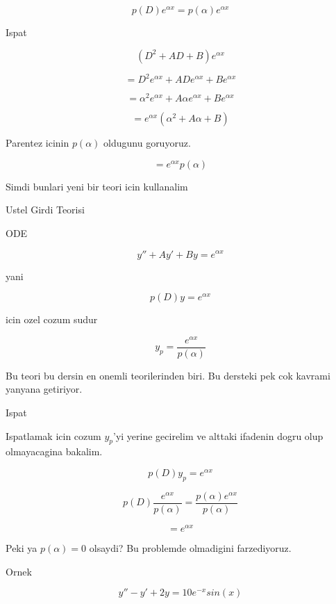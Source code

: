 \documentclass[12pt,fleqn]{article}
\begin{document}
\[ p(D)e^{\alpha x} = p(\alpha)e^{\alpha x}  \]

Ispat

\[ (D^2 + AD + B )e^{\alpha x} \]

\[ = D^2e^{\alpha x} + ADe^{\alpha x} + Be^{\alpha x} \]

\[ = \alpha^2 e^{\alpha x} + A \alpha e^{\alpha x} + Be^{\alpha x} \]

\[ = e^{\alpha x}(\alpha^2  + A \alpha + B)\]

Parentez icinin $p(\alpha)$ oldugunu goruyoruz. 

\[ = e^{\alpha x}p(\alpha)\]

Simdi bunlari yeni bir teori icin kullanalim

Ustel Girdi Teorisi

ODE

\[ y'' + Ay' + By = e^{\alpha x} \]

yani

\[ p(D)y = e^{\alpha x} \]

icin ozel cozum sudur

\[ y_p = \frac{e^{\alpha x}}{p(\alpha)} \]

Bu teori bu dersin en onemli teorilerinden biri. Bu dersteki pek cok
kavrami yanyana getiriyor. 

Ispat

Ispatlamak icin cozum $y_p$'yi yerine gecirelim ve alttaki ifadenin dogru
olup olmayacagina bakalim.

\[ p(D)y_p =  e^{\alpha x} \]

\[ p(D)\frac{e^{\alpha x}}{p(\alpha)} = \frac{p(\alpha)e^{\alpha x}}{p(\alpha)} \]

\[ = e^{\alpha x} \]

Peki ya $p(\alpha) = 0$ olsaydi? Bu problemde olmadigini farzediyoruz. 

Ornek 

\[ y'' - y' + 2y = 10e^{-x}sin(x) \]
\end{document}
